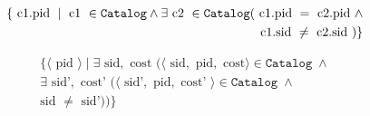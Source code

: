 \begin{align*}
  \{ \text{ c1.pid } \mid \text{ c1 } \in \mathtt{Catalog} \wedge \exists \text{ c2 } \in \mathtt{Catalog} 
  ( \text{ c1.pid } = \text{ c2.pid } \wedge \\ \text{ c1.sid } \neq \text{ c2.sid }) \}
\end{align*}

\begin{align*}
  \{\langle \text{ pid } \rangle 
    \mid \exists \text{ sid}, \text{ cost } 
    (\langle \text{ sid}, \text{ pid}, \text{ cost} \rangle 
      \in \mathtt{Catalog} \; \wedge \\ \exists \text{ sid'}, \text{ cost' } (
        \langle \text{ sid'}, \text{ pid}, \text{ cost' } \rangle 
    \in \mathtt{Catalog} \; \wedge \\
  \text{sid } \neq \text{ sid'}))\}
\end{align*}

